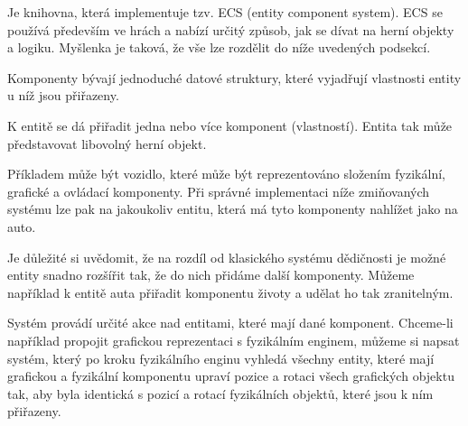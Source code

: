 \label{sec:ces}
Je knihovna, která implementuje tzv. ECS (entity component system). ECS se používá především ve hrách a nabízí určitý způsob, jak se dívat na herní objekty a logiku. Myšlenka je taková, že vše lze rozdělit do níže uvedených podsekcí.

Komponenty bývají jednoduché datové struktury, které vyjadřují vlastnosti entity u níž jsou přiřazeny.

K entitě se dá přiřadit jedna nebo více komponent (vlastností). Entita tak může představovat libovolný herní objekt. 

Příkladem může být vozidlo, které může být reprezentováno složením fyzikální, grafické a ovládací komponenty. Při správné implementaci níže zmiňovaných systému lze pak na jakoukoliv entitu, která má tyto komponenty nahlížet jako na auto.

Je důležité si uvědomit, že na rozdíl od klasického systému dědičnosti je možné entity snadno rozšířit tak, že do nich přidáme další komponenty. Můžeme například k entitě auta přiřadit komponentu životy a udělat ho tak zranitelným.

Systém provádí určité akce nad entitami, které mají dané komponent. Chceme-li například propojit grafickou reprezentaci s fyzikálním enginem, můžeme si napsat systém, který po kroku fyzikálního enginu vyhledá všechny entity, které mají grafickou a fyzikální komponentu upraví pozice a rotaci všech grafických objektu tak, aby byla identická s pozicí a rotací fyzikálních objektů, které jsou k ním přiřazeny.